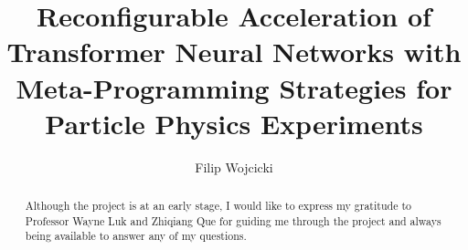 \documentclass[a4paper, twoside]{report}
\title{Reconfigurable Acceleration of Transformer Neural Networks with Meta-Programming Strategies for Particle Physics Experiments}
\author{Filip Wojcicki}
\begin{document}



\renewcommand{\abstractname}{Acknowledgements}
\begin{abstract}
Although the project is at an early stage, I would like to express my gratitude to Professor Wayne Luk and Zhiqiang Que for guiding me through the project and always being available to answer any of my questions.
\end{abstract}

{\hypersetup{linkcolor=black} \tableofcontents}
\listoffigures
\listoftables







% 
% 




\listoftodos[Notes]
\end{document}
